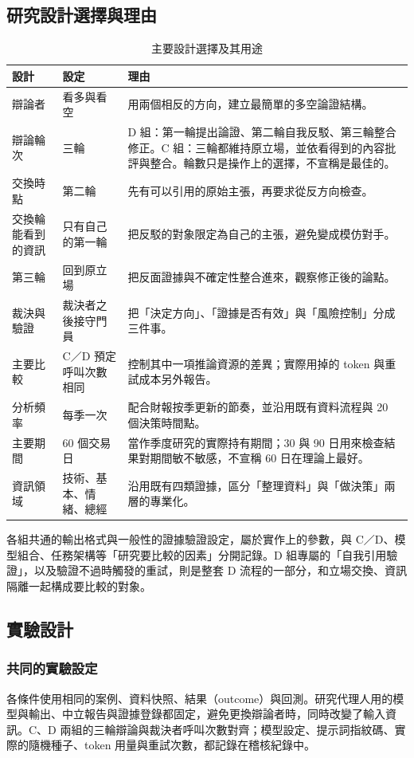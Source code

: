 \documentclass[12pt,a4paper]{article}
\numberwithin{table}{section}
\numberwithin{figure}{section}
\begin{document}
\subsection{研究設計選擇與理由}
\begin{table}[H]\centering\small
\caption{主要設計選擇及其用途}
\begin{tabularx}{\textwidth}{@{}L{.17} L{.19} Y@{}}\toprule
設計 & 設定 & 理由 \\\midrule
辯論者 & 看多與看空 & 用兩個相反的方向，建立最簡單的多空論證結構。\\
辯論輪次 & 三輪 & D 組：第一輪提出論證、第二輪自我反駁、第三輪整合修正。C 組：三輪都維持原立場，並依看得到的內容批評與整合。輪數只是操作上的選擇，不宣稱是最佳的。\\
交換時點 & 第二輪 & 先有可以引用的原始主張，再要求從反方向檢查。\\
交換輪能看到的資訊 & 只有自己的第一輪 & 把反駁的對象限定為自己的主張，避免變成模仿對手。\\
第三輪 & 回到原立場 & 把反面證據與不確定性整合進來，觀察修正後的論點。\\
裁決與驗證 & 裁決者之後接守門員 & 把「決定方向」、「證據是否有效」與「風險控制」分成三件事。\\
主要比較 & C／D 預定呼叫次數相同 & 控制其中一項推論資源的差異；實際用掉的 token 與重試成本另外報告。\\
分析頻率 & 每季一次 & 配合財報按季更新的節奏，並沿用既有資料流程與 20 個決策時間點。\\
主要期間 & 60 個交易日 & 當作季度研究的實際持有期間；30 與 90 日用來檢查結果對期間敏不敏感，不宣稱 60 日在理論上最好。\\
資訊領域 & 技術、基本、情緒、總經 & 沿用既有四類證據，區分「整理資料」與「做決策」兩層的專業化。\\\bottomrule
\end{tabularx}\end{table}
各組共通的輸出格式與一般性的證據驗證設定，屬於實作上的參數，與 C／D、模型組合、任務架構等「研究要比較的因素」分開記錄。D 組專屬的「自我引用驗證」，以及驗證不過時觸發的重試，則是整套 D 流程的一部分，和立場交換、資訊隔離一起構成要比較的對象。

\subsection{實驗設計}

\subsubsection{共同的實驗設定}
各條件使用相同的案例、資料快照、結果（outcome）與回測。研究代理人用的模型與輸出、中立報告與證據登錄都固定，避免更換辯論者時，同時改變了輸入資訊。C、D 兩組的三輪辯論與裁決者呼叫次數對齊；模型設定、提示詞指紋碼、實際的隨機種子、token 用量與重試次數，都記錄在稽核紀錄中。
\end{document}
